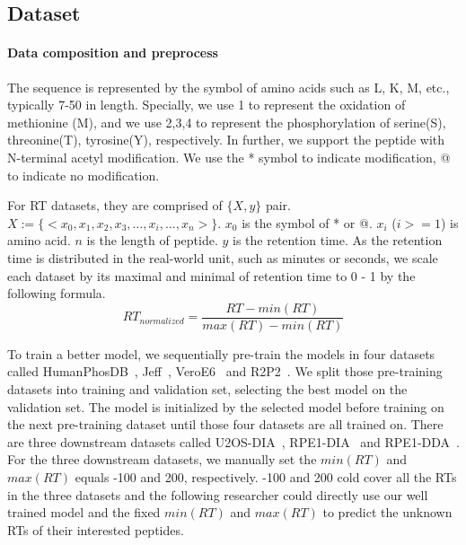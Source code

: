 
\subsection{Dataset}
\paragraph*{Data composition and preprocess}
The sequence is represented by the symbol of amino acids such as L, K, M, etc., typically 7-50 in length. Specially, we use 1 to represent the oxidation of methionine (M), and we use 2,3,4 to represent the phosphorylation of serine(S), threonine(T), tyrosine(Y), respectively. In further, we support the peptide with N-terminal acetyl modification. We use the * symbol to indicate modification, @ to indicate no modification. 

For RT datasets, they are comprised of \( \{X, y\} \) pair. 
$X:= \{ <x_0, x_1, x_2, x_3,\dots, x_i, \dots, x_n>\}$. $x_0$ is the symbol of * or @. 
$x_i$ ($i>= 1$) is amino acid. $n$ is the length of peptide. \( y \) is the retention time. 
As the retention time is distributed in the real-world unit, such as minutes or seconds, we scale each dataset by its maximal and minimal of retention time to 0 - 1 by the following formula. 
\[RT_{normalized} =  \frac{RT-min(RT)}{max(RT)-min(RT)}\]

To train a better model, we sequentially pre-train the models in four datasets called 
HumanPhosDB~\cite{lawrence2016plug}, Jeff~\cite{liu2018vivo}, VeroE6~\cite{bouhaddou2020global}
and R2P2~\cite{leutert2019r2}. We split those pre-training datasets into training and validation set, selecting the best model on the validation set. The model is initialized by the selected model before training on the next pre-training dataset until those four datasets are all trained on. There are three downstream datasets called U2OS-DIA~\cite{wang2020naguider}, RPE1-DIA~\cite{bekker2020rapid} and RPE1-DDA~\cite{bekker2020rapid}. For the three downstream datasets, we manually set the $min(RT)$ and $max(RT)$ equals -100 and 200, respectively. -100 and 200 cold cover all the RTs in the three datasets and the following researcher could directly use our well trained model and the fixed $min(RT)$ and $max(RT)$ to predict the unknown RTs of their interested peptides.

